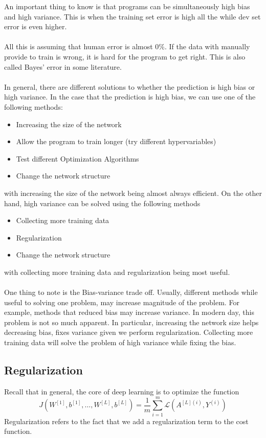 \documentclass[a4paper]{article}
\begin{document}
\begin{enumerate}
An important thing to know is that programs can be simultaneously high bias and high variance. This is when the training set error is high all the while dev set error is even higher. \\~\\

All this is assuming that human error is almost $0\%$. If the data with manually provide to train is wrong, it is hard for the program to get right. This is also called Bayes' error in some literature. \\~\\
In general, there are different solutions to whether the prediction is high bias or high variance. In the case that the prediction is high bias, we can use one of the following methods: 
\begin{itemize}
\item Increasing the size of the network
\item Allow the program to train longer (try different hypervariables)
\item Test different Optimization Algorithms
\item Change the network structure
\end{itemize}
with increasing the size of the network being almost always efficient. On the other hand, high variance can be solved using the following methods 
\begin{itemize}
\item Collecting more training data
\item Regularization
\item Change the network structure
\end{itemize}
with collecting more training data and regularization being most useful. \\~\\
One thing to note is the Bias-variance trade off. Usually, different methods while useful to solving one problem, may increase magnitude of the problem. For example, methods that reduced bias may increase variance. In modern day, this problem is not so much apparent. In particular, increasing the network size helps decreasing bias, fixes variance given we perform regularization. Collecting more training data will solve the problem of high variance while fixing the bias. 

\subsection{Regularization}
Recall that in general, the core of deep learning is to optimize the function $$J(W^{[1]},b^{[1]},\dots,W^{[L]},b^{[L]})=\frac{1}{m}
\sum_{i=1}^m\mathcal{L}(A^{[L](i)},Y^{(i)})$$ Regularization refers to the fact that we add a regularization term to the cost function. 


\end{enumerate}
\end{document}
